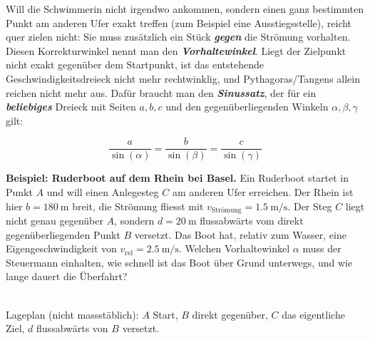 \documentclass[addpoints,11pt,a4paper]{exam}
\begin{document}
\begin{vertiefungbox}
Will die Schwimmerin nicht irgendwo ankommen, sondern einen ganz bestimmten
Punkt am anderen Ufer exakt treffen (zum Beispiel eine Ausstiegsstelle),
reicht \glqq quer zielen\grqq{} nicht: Sie muss zusätzlich ein Stück
\textbf{\emph{gegen}} die Strömung vorhalten. Diesen Korrekturwinkel nennt
man den \textbf{\emph{Vorhaltewinkel}}. Liegt der Zielpunkt nicht exakt
gegenüber dem Startpunkt, ist das entstehende Geschwindigkeitsdreieck nicht
mehr rechtwinklig, und Pythagoras/Tangens allein reichen nicht mehr aus.
Dafür braucht man den \textbf{\emph{Sinussatz}}, der für ein
\textbf{\emph{beliebiges}} Dreieck mit Seiten $a,b,c$ und den
gegenüberliegenden Winkeln $\alpha,\beta,\gamma$ gilt:
\begin{formelbox}[Sinussatz]
\[
  \boxed{\frac{a}{\sin(\alpha)} = \frac{b}{\sin(\beta)} = \frac{c}{\sin(\gamma)}}
\]
\end{formelbox}

\textbf{Beispiel: Ruderboot auf dem Rhein bei Basel.} Ein Ruderboot startet
in Punkt $A$ und will einen Anlegesteg $C$ am anderen Ufer erreichen. Der
Rhein ist hier $b=\SI{180}{\meter}$ breit, die Strömung fliesst mit
$v_{\text{Strömung}}=\SI{1.5}{\meter\per\second}$. Der Steg $C$ liegt nicht
genau gegenüber $A$, sondern $d=\SI{20}{\meter}$ flussabwärts vom direkt
gegenüberliegenden Punkt $B$ versetzt. Das Boot hat, relativ zum Wasser,
eine Eigengeschwindigkeit von $v_{\text{rel}}=\SI{2.5}{\meter\per\second}$.
Welchen Vorhaltewinkel $\alpha$ muss der Steuermann einhalten, wie schnell
ist das Boot über Grund unterwegs, und wie lange dauert die Überfahrt?

\begin{center}
\\[-0.1em]
{\scriptsize Lageplan (nicht massstäblich): $A$ Start, $B$ direkt
gegenüber, $C$ das eigentliche Ziel, $d$ flussabwärts von $B$ versetzt.}
\end{center}


\end{vertiefungbox}
\end{document}
